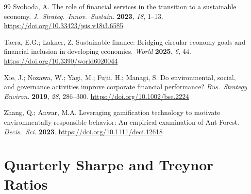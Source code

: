 \documentclass[12pt]{article}
\begin{document}
\begin{thebibliography}{99}
Svoboda, A. The role of financial services in the transition to a sustainable economy. \textit{J.~Strateg.\ Innov.\ Sustain.} \textbf{2023}, \textit{18}, 1--13. \url{https://doi.org/10.33423/jsis.v18i3.6585}

Taera, E.G.; Lakner, Z. Sustainable finance: Bridging circular economy goals and financial inclusion in developing economies. \textit{World} \textbf{2025}, \textit{6}, 44. \url{https://doi.org/10.3390/world6020044}

Xie, J.; Nozawa, W.; Yagi, M.; Fujii, H.; Managi, S. Do environmental, social, and governance activities improve corporate financial performance? \textit{Bus.~Strategy Environ.} \textbf{2019}, \textit{28}, 286--300. \url{https://doi.org/10.1002/bse.2224}

Zhang, Q.; Anwar, M.A. Leveraging gamification technology to motivate environmentally responsible behavior: An empirical examination of Ant Forest. \textit{Decis.\ Sci.} \textbf{2023}. \url{https://doi.org/10.1111/deci.12618}

\end{thebibliography}

\newpage
\appendix
\section{Quarterly Sharpe and Treynor Ratios}\label{app:quarterly}
\end{document}

